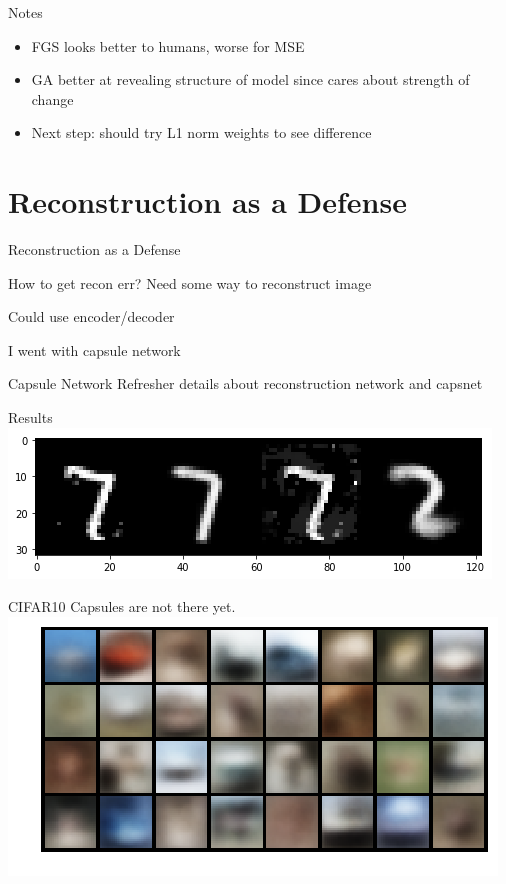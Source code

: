 \documentclass{beamer}
\begin{document}
	\begin{frame}{Notes}
		\begin{itemize}
			\item FGS looks better to humans, worse for MSE
			\item GA better at revealing structure of model since cares about strength of change
			\item Next step: should try L1 norm weights to see difference
		\end{itemize}
	\end{frame}

	\section*{Reconstruction as a Defense}
	
	\begin{frame}{Reconstruction as a Defense}
		\begin{block}{How to get recon err?}
			Need some way to reconstruct image
			
			Could use encoder/decoder
			
			I went with capsule network
		\end{block}
	\end{frame}
	
	\begin{frame}{Capsule Network Refresher}
		details about reconstruction network and capsnet
	\end{frame}
	
	\begin{frame}{Results}
		\centering
		\includegraphics[width=\textwidth]{recon-fig1}
	\end{frame}
	
	\begin{frame}{CIFAR10}
		Capsules are not there yet.
		\includegraphics[width=\textwidth]{cifar_recon}
	\end{frame}
	
\end{document}
